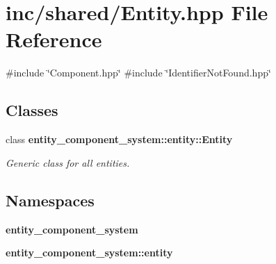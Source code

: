 \section{inc/shared/\+Entity.hpp File Reference}
\label{_entity_8hpp}
{\ttfamily \#include \char`\"{}Component.\+hpp\char`\"{}}\newline
{\ttfamily \#include \char`\"{}Identifier\+Not\+Found.\+hpp\char`\"{}}\newline
\subsection*{Classes}
\begin{DoxyCompactItemize}
\item 
class {\bf entity\+\_\+component\+\_\+system\+::entity\+::\+Entity}
\begin{DoxyCompactList}\small\item\em Generic class for all entities. \end{DoxyCompactList}\end{DoxyCompactItemize}
\subsection*{Namespaces}
\begin{DoxyCompactItemize}
\item 
 {\bf entity\+\_\+component\+\_\+system}
\item 
 {\bf entity\+\_\+component\+\_\+system\+::entity}
\end{DoxyCompactItemize}
